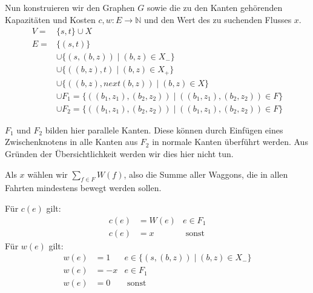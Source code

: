 \documentclass[a4paper]{article}
\begin{document}
Nun konstruieren wir den Graphen $G$ sowie die zu den Kanten gehörenden
Kapazitäten und Kosten $c, w: E \rightarrow \mathbb{N}$ und den Wert des zu suchenden
Flusses $x$.
\begin{align*}
V = & \{s, t\} \cup X \\
E = & \{ (s, t) \} \\
	& \cup \{ (s, (b, z)) \mid (b, z) \in X_- \} \\
	& \cup \{ ((b, z), t) \mid (b, z) \in X_+ \} \\
	& \cup \{ ((b, z), next(b, z)) \mid (b, z) \in X \} \\
	& \cup F_1 = \{ ((b_1, z_1), (b_2, z_2)) \mid ((b_1, z_1), (b_2, z_2)) \in F \} \\
	& \cup F_2 = \{ ((b_1, z_1), (b_2, z_2)) \mid ((b_1, z_1), (b_2, z_2)) \in F \}
\end{align*}

$F_1$ und $F_2$ bilden hier parallele Kanten. Diese können durch Einfügen
eines Zwischenknotens in alle Kanten aus $F_2$ in normale Kanten überführt
werden. Aus Gründen der Übersichtlichkeit werden wir dies hier nicht tun.

Als $x$ wählen wir $\sum_{f \in F} W(f)$, also die Summe aller Waggons, die
in allen Fahrten mindestens bewegt werden sollen.

Für $c(e)$ gilt:
\begin{align*}
c(e) &= W(e) & e \in F_1 \\
c(e) &= x & \text{ sonst}
\end{align*}
Für $w(e)$ gilt:
\begin{align*}
w(e) &= 1 & e \in \{ (s, (b, z)) \mid (b, z) \in X_- \} \\
w(e) &= -x & e \in F_1 \\
w(e) &= 0 & \text{ sonst}
\end{align*}
\end{document}
